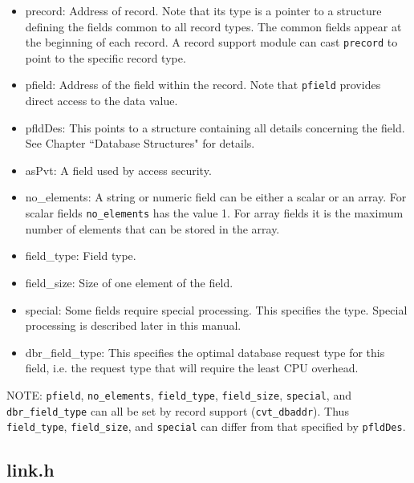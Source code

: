 \begin{itemize}\item {}precord: Address of record. Note that its type is a pointer to a structure defining the fields common to all record 
types. The common fields appear at the beginning of each record. A record support module can cast \verb|precord| to 
point to the specific record type.

\item {}pfield: Address of the field within the record. Note that \verb|pfield| provides direct access to the data value.

\item {}pfldDes: This points to a structure containing all details concerning the field. See Chapter ``Database Structures" 
for details.

\item {}asPvt: A field used by access security.

\item {}no\_elements: A string or numeric field can be either a scalar or an array. For scalar fields \verb|no_elements| has the 
value 1. For array fields it is the maximum number of elements that can be stored in the array.

\item {}field\_type: Field type.

\item {}field\_size: Size of one element of the field.

\item {}special: Some fields require special processing. This specifies the type. Special processing is described later in this 
manual.

\item {}dbr\_field\_type: This specifies the optimal database request type for this field, i.e. the request type that will require 
the least CPU overhead.

\end{itemize}NOTE: \verb|pfield|, \verb|no_elements|, \verb|field_type|, \verb|field_size|, \verb|special|, and \verb|dbr_field_type| can all be set by 
record support (\verb|cvt_dbaddr|). Thus \verb|field_type|, \verb|field_size|, and \verb|special| can differ from that specified by 
\verb|pfldDes|.

\subsection{link.h }


